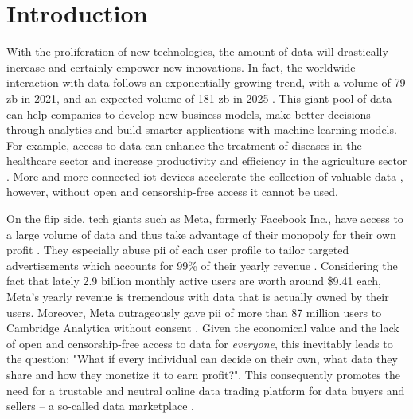 \chapter{Introduction}
\label{cha:introduction}


With the proliferation of new technologies, the amount of data will drastically increase and certainly empower new innovations. In fact, the worldwide interaction with data follows an exponentially growing trend, with a volume of 79 \acrfull{zb} in 2021, and an expected volume of 181 \acrshort{zb} in 2025 \cite{statistaDataWorldWide}. This giant pool of data can help companies to develop new business models, make better decisions through analytics and build smarter applications with machine learning models. For example, access to data can enhance the treatment of diseases in the healthcare sector \cite{koutsosAgoraPrivacyAwareData,wangBigDataAnalytics2018,suBDTFBlockchainBasedData2020} and increase productivity and efficiency in the agriculture sector \cite{elijahOverviewInternetThings2018}. More and more connected \acrfull{iot} devices accelerate the collection of valuable data \cite{ozyilmazIDMoBIoTData2018,lawrenzBlockchainTechnologyApproach2019}, however, without open and censorship-free access it cannot be used.

On the flip side, tech giants such as Meta, formerly Facebook Inc., have access to a large volume of data and thus take advantage of their monopoly for their own profit \cite{serranoPeertoPeerOwnershipPreservingData2021}. They especially abuse \acrfull{pii} of each user profile to tailor targeted advertisements which accounts for 99\% \cite{GlobalMetaAdvertising} of their yearly revenue \cite{arrategalanLargeScaleAnalysisUser2019}. Considering the fact that lately 2.9 billion monthly active users \cite{FacebookMAUWorldwide} are worth around \$9.41 \cite{FacebookAverageRevenue} each, Meta's yearly revenue is tremendous with data that is actually owned by their users. Moreover, Meta outrageously gave \acrshort{pii} of more than 87 million users to Cambridge Analytica without consent \cite{isaakUserDataPrivacy2018,xiaoPrivacyGuardEnforcingPrivate2020}. Given the economical value and the lack of open and censorship-free access to data for \emph{everyone}, this inevitably leads to the question: "What if every individual can decide on their own, what data they share and how they monetize it to earn profit?". This consequently promotes the need for a trustable and neutral online data trading platform for data buyers and sellers -- a so-called data marketplace \cite{dagevilleSnowflakeElasticData2016,krishnamachariI3IoTMarketplace2018}.

